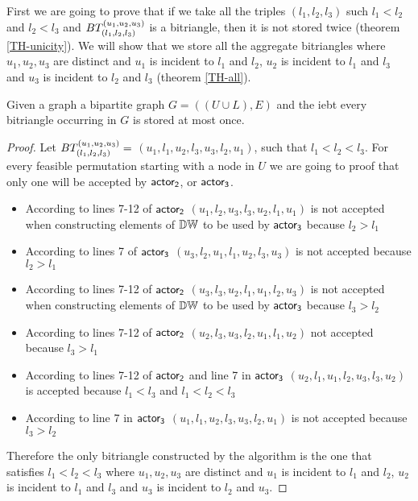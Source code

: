 First we are going to prove that if we take all the triples $(l_1,l_2,l_3)$  such $l_1<l_2$ and $l_2<l_3$  and  $BT_{(l_1, l_2,l_3)}^{(u_1, u_2, u_3)}$ is a  bitriangle, then it is not stored twice (theorem \ref{TH-unicity}). 
We will show that we store all the aggregate bitriangles where $u_1,u_2,u_3$  are distinct and $u_1$ is incident to $l_1$ and $l_2$, $u_2$ is incident to $l_1$ and $l_3$ and $u_3$ is incident to $l_2$ and $l_3$ (theorem \ref{TH-all}). 
\begin{theorem} \label{TH-unicity} Given a graph a bipartite graph $G = ((U\cup L),E)$ and the \acrshort{iebt} every bitriangle occurring in $G$ is stored at most once.

\end{theorem}
\begin{proof}

Let $BT_{(l_1, l_2,l_3)}^{(u_1, u_2, u_3)} =$  $(u_1,l_1,u_2,l_3,u_3,l_2,u_1)$, such that $l_1 < l_2 <l_3$. For every feasible permutation  starting with a node in $U$ we are going to proof that only one will be accepted by $\mathsf{actor_2}$, or $\mathsf{actor_3}$.  
\begin{itemize}
      \item According to lines 7-12 of $\mathsf{actor_2}$ $(u_1,l_2,u_3,l_3,u_2,l_1,u_1)$ is  not accepted  when constructing elements of $\mathbb{DW}$ to be used by $\mathsf{actor_3}$  because $l_2 > l_1$ 
      \item According to lines 7 of $\mathsf{actor_3}$ $(u_3,l_2,u_1,l_1,u_2,l_3,u_3)$ is not accepted because $l_2 > l_1$
      \item According to lines 7-12 of $\mathsf{actor_2}$ $(u_3,l_3,u_2,l_1,u_1,l_2,u_3)$ is  not accepted  when constructing elements of $\mathbb{DW}$ to be used by $\mathsf{actor_3}$  because  $l_3 > l_2$
      \item According to lines 7-12 of $\mathsf{actor_2}$ $(u_2,l_3,u_3,l_2,u_1,l_1,u_2)$ not accepted because $l_3 > l_1 $
      \item  According to lines 7-12 of $\mathsf{actor_2}$ and line 7 in $\mathsf{actor_3}$ $(u_2,l_1,u_1,l_2,u_3,l_3,u_2)$ is accepted because $l_1 < l_3 $ and $l_1 < l_2 <l_3$ 
      \item According to  line 7 in $\mathsf{actor_3}$ $(u_1, l_1,u_2,l_3,u_3,l_2,u_1)$ is not accepted because $l_3 > l_2$
\end{itemize}


Therefore the  only bitriangle  constructed by the algorithm is the one that satisfies $l_1 < l_2 < l_3$ where $u_1,u_2,u_3$  are distinct and $u_1$ is incident to $l_1$ and $l_2$, $u_2$ is incident to $l_1$ and $l_3$ and $u_3$ is incident to $l_2$ and $u_3$.
\end{proof}


